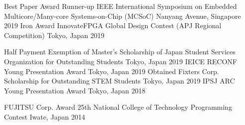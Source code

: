 

\begin{cvhonors}
  \cvhonor
    {Best Paper Award Runner-up} %
    {IEEE International Symposium on Embedded Multicore/Many-core Systems-on-Chip (MCSoC)} %
    {Nanyang Avenue, Singapore} %
    {2019} %
  \cvhonor
    {Iron Award} %
    {InnovateFPGA Global Design Contest (APJ Regional Competition)} %
    {Tokyo, Japan} %
    {2019} %
\end{cvhonors}


\begin{cvhonors}
  \cvact
    {Half Payment Exemption of Master's Scholarship of Japan Student Services Organization for Outstanding Students} %
    {} 
    {Tokyo, Japan} %
    {2019} %
  \cvact
    {IEICE RECONF Young Presentation Award} %
    {} %
    {Tokyo, Japan} %
    {2019} %
  \cvact
    {Obtained Fixters Corp. Scholarship for Outstanding STEM Students} %
    {} 
    {Tokyo, Japan} %
    {2019} %
  \cvact
    {IPSJ ARC Young Presentation Award} %
    {} %
    {Tokyo, Japan} %
    {2018} %

  \cvhonor
    {FUJITSU Corp. Award} %
    {25th National College of Technology Programming Contest } %
    {Iwate, Japan} %
    {2014} %
    

\end{cvhonors}
